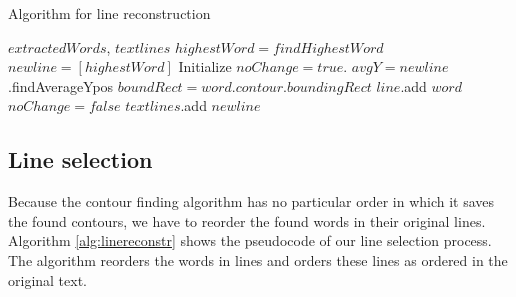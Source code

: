 \documentclass{article}
\begin{document}
\begin{algorithm}[tb]
   \caption{Algorithm for line reconstruction}
   \label{alg:linereconstr}
\begin{algorithmic}
    $extractedWords$, $textlines$
   \REPEAT
        \STATE $highestWord = findHighestWord $
        \STATE $newline = [highestWord]$
        \STATE Initialize $noChange = true$.
        \STATE $avgY= newline$.findAverageYpos
        \REPEAT
            \STATE $boundRect = word.contour.boundingRect$
            \STATE $line$.add $word$
            \STATE $noChange = false$
            \ENDIF
        \ENDFOR
        \STATE $textlines$.add $newline$
\end{algorithmic}
\end{algorithm}

\subsection{Line selection}
Because the contour finding algorithm has no particular order in which it saves the found contours, we have to reorder the found words in their original lines.
Algorithm \ref{alg:linereconstr} shows the pseudocode of our line selection process.
The algorithm reorders the words in lines and orders these lines as ordered in the original text.
\end{document}
